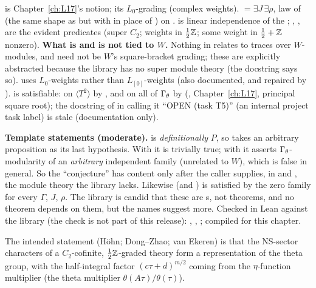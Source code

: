 \begin{dictionary}
 is Chapter~\ref{ch:L17}'s notion;  its $L_0$-grading (complex weights).
 $=\exists J\,\exists\rho$, law of  (the same shape as
 but with  in place of ) on . 
is linear independence of the ; , ,  are the
evident predicates (super $C_2$; weights in $\frac12{\mathbb{Z}}$; some weight in $\frac12+{\mathbb{Z}}$ nonzero). \textbf{What is and is not tied
to $W$.} Nothing in  relates  to traces over $W$-modules, and  need not be
$W$'s square-bracket grading; these are explicitly abstracted because the library has no super module theory (the docstring
says so).  uses $L_0$-weights rather than $L_{[0]}$-weights (also documented, and repaired by
).  is satisfiable: on $\langle T^2\rangle$ by , and on all
of $\Gamma_\theta$ by  (, Chapter~\ref{ch:L17}, principal square
root); the docstring of  in  calling it ``OPEN (task T5)'' (an internal project task label) is
stale (documentation only).
\end{dictionary}
\begin{warning}
\textbf{Template statements (moderate).}  is \emph{definitionally} $P$, so  takes an arbitrary proposition as its last hypothesis. With  it is trivially true; with  it asserts $\Gamma_\theta$-modularity of an \emph{arbitrary} independent family  (unrelated to $W$), which is false
in general. So the ``conjecture'' has content only after the caller supplies, in  and , the module theory
the library lacks. Likewise  (and ) is satisfied by the zero family for every
$\Gamma$, $J$, $\rho$. The library is candid that these are s, not theorems, and no theorem depends on them, but
the names suggest more. Checked in Lean against the library (the check is not part of this release):
, , ; compiled for this chapter.
\end{warning}
\begin{physics}
The intended statement (Höhn; Dong--Zhao; van Ekeren) is that the NS-sector characters of a $C_2$-cofinite, $\frac12{\mathbb{Z}}$-graded
theory form a representation of the theta group, with the half-integral factor $(c\tau+d)^{m/2}$ coming from the
$\eta$-function multiplier (the theta multiplier $\theta(A\tau)/\theta(\tau)$).
\end{physics}

